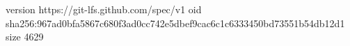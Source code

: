 version https://git-lfs.github.com/spec/v1
oid sha256:967ad0bfa5867c680f3ad0cc742e5dbef9cac6c1c6333450bd73551b54db12d1
size 4629
